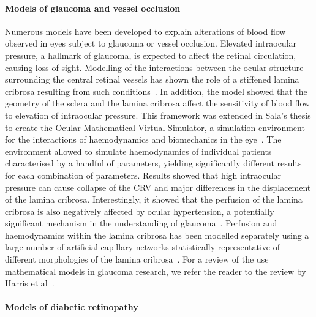 \documentclass{article}
\begin{document}
\paragraph*{Models of glaucoma and vessel occlusion}

Numerous models have been developed to explain alterations of blood flow observed in eyes subject to glaucoma or vessel occlusion\cite{Chuangsuwanich_2016,Guidoboni_2014,Sala_2018,Sala_2020}.
Elevated intraocular pressure, a hallmark of glaucoma, is expected to affect the retinal circulation, causing loss of sight.
Modelling of the interactions between the ocular structure surrounding the central retinal vessels has shown the role of a stiffened lamina cribrosa resulting from such conditions~\cite{Guidoboni_2014}.
In addition, the model showed that the geometry of the sclera and the lamina cribrosa affect the sensitivity of blood flow to elevation of intraocular pressure.
This framework was extended in Sala's thesis to create the Ocular Mathematical Virtual Simulator, a simulation environment for the interactions of haemodynamics and biomechanics in the eye~\cite{Sala_2018,Sala_2020}.
The environment allowed to simulate haemodynamics of individual patients characterised by a handful of parameters, yielding significantly different results for each combination of parameters.
Results showed that high intraocular pressure can cause collapse of the CRV and major differences in the displacement of the lamina cribrosa.
Interestingly, it showed that the perfusion of the lamina cribrosa is also negatively affected by ocular hypertension, a potentially significant mechanism in the understanding of glaucoma~\cite{Sala_2020}.
Perfusion and haemodynamics within the lamina cribrosa has been modelled separately using a large number of artificial capillary networks statistically representative of different morphologies of the lamina cribrosa~\cite{Chuangsuwanich_2016}.
For a review of the use mathematical models in glaucoma research, we refer the reader to the review by Harris et al~\cite{Harris_2013}.

\paragraph*{Models of diabetic retinopathy}
\end{document}
